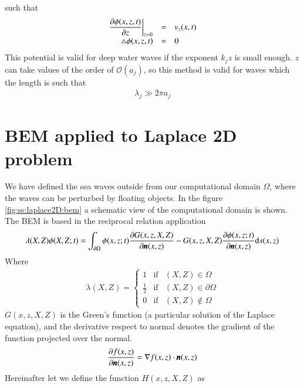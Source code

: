 %
such that
%
\begin{eqnarray*}
	\begin{array}{rcl}
		\dsty{\left. \frac{\partial \phi(x,z,t)}{\partial z} \right\vert_{z=0}} & = & v_z(x,t)
		\\
		\laplacian \phi(x,z,t) & = & 0
	\end{array}
\end{eqnarray*}
%
This potential is valid for deep water waves if the exponent
$k_j z$ is small enough. $z$ can take values of the order of
$\mathcal{O}(a_j)$, so this method is valid for waves which
the length is such that
%
\begin{eqnarray*}
	\lambda_j \gg 2 \pi a_j
\end{eqnarray*}
%
\section{BEM applied to Laplace 2D problem}
\label{ss:laplace2D:bem}
%
We have defined the sea waves outside from our computational domain
$\Omega$, where the waves can be perturbed by floating objects. In
the figure \ref{fig:ss:laplace2D:bem} a schematic view of the
computational domain is shown.\rc
%
The BEM is based in the reciprocal relation application
%
\begin{eqnarray}
	\label{eq:laplace2D:reciprocal_relation}
	\lambda(X, Z) \phi(X, Z; t) = \int_{\partial \Omega}
	\phi(x, z; t) \frac{\partial G(x, z, X, Z)}{\partial \bs{n}(x, z)} -
	G(x, z, X, Z) \frac{\partial \phi(x, z; t)}{\partial \bs{n}(x, z)}
	\mbox{d} s(x, z)
\end{eqnarray}
%
Where
%
\begin{eqnarray*}
\lambda(X, Z) = \left\lbrace
\begin{array}{lcl}
	1           & \mbox{if} & (X, Z) \in \Omega
	\\
	\frac{1}{2} & \mbox{if} & (X, Z) \in \partial \Omega
	\\
	0           & \mbox{if} & (X, Z) \not \in \Omega	
\end{array}
\right.
\end{eqnarray*}
%
$G(x, z, X, Z)$ is the Green's function (a particular solution
of the Laplace equation), and the derivative respect to normal
denotes the gradient of the function projected over the normal.
%
\begin{eqnarray*}
\frac{\partial f(x, z)}{\partial \bs{n}(x, z)} =
\gradient f(x, z) \cdot \bs{n}(x, z)
\end{eqnarray*}
%
Hereinafter let we define the function $H(x, z, X, Z)$ as
